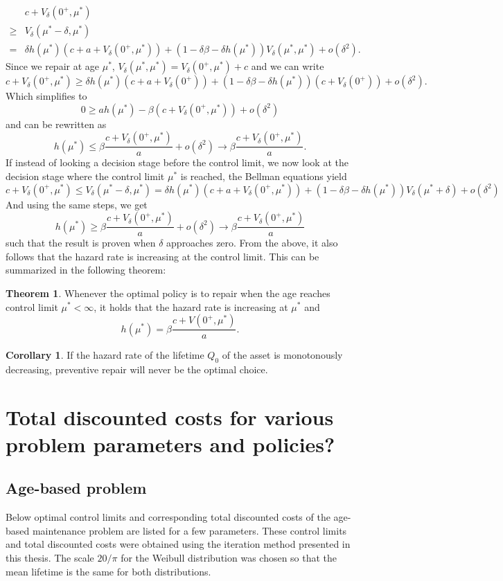 \documentclass[a4paper]{thesis}
\theoremstyle{definition}
\newtheorem{corollary}{Corollary}[chapter]
\newtheorem{theorem}{Theorem}[chapter]
\begin{document}
\begin{appendices}
\[\begin{split}
&c+V_\delta(0^+,\mu^*)\\
\geq& V_\delta(\mu^*-\delta,\mu^*)\\
=&\delta h(\mu^*)(c+a+ V_\delta(0^+,\mu^*))+(1-\delta\beta-\delta h(\mu^*)) V_\delta(\mu^*,\mu^*)+o(\delta^2).
\end{split}
\]
Since we repair at age $\mu^*$, $V_\delta(\mu^*,\mu^*)=V_\delta(0^+,\mu^*)+c$ and we can write
$$
c+V_\delta(0^+,\mu^*)\geq \delta h(\mu^*)(c+a+ V_\delta(0^+))+(1-\delta\beta-\delta h(\mu^*)) (c+V_\delta(0^+))+o(\delta^2).
$$
Which simplifies to
$$
0\geq ah(\mu^*)-\beta (c+V_\delta(0^+,\mu^*))+o(\delta^2)
$$
and can be rewritten as
$$
h(\mu^*)\leq \beta\frac{c+V_\delta(0^+,\mu^*)}{a} +o(\delta^2)\rightarrow\beta\frac{c+V_\delta(0^+,\mu^*)}{a}.
$$
If instead of looking a decision stage before the control limit, we now look at the decision stage where the control limit $\mu^*$ is reached, the Bellman equations yield
$$
c+V_\delta(0^+,\mu^*)\leq V_\delta(\mu^*-\delta,\mu^*)=\delta h(\mu^*)(c+a+ V_\delta(0^+,\mu^*))+(1-\delta\beta-\delta h(\mu^*)) V_\delta(\mu^*+\delta)+o(\delta^2)
$$
And using the same steps, we get
$$
h(\mu^*)\geq \beta\frac{c+V_\delta(0^+,\mu^*)}{a} +o(\delta^2)\rightarrow\beta\frac{c+V_\delta(0^+,\mu^*)}{a}
$$
such that the result is proven when $\delta$ approaches zero.
From the above, it also follows that the hazard rate is increasing at the control limit.
This can be summarized in the following theorem:

\begin{theorem}
	Whenever the optimal policy is to repair when the age reaches control limit $\mu^*<\infty$, it holds that the hazard rate is increasing at $\mu^*$ and
	\[h(\mu^*)=\beta\frac{c+V(0^+,\mu^*)}{a}.\]
\end{theorem}

\begin{corollary}
	If the hazard rate of the lifetime $Q_0$ of the asset is monotonously decreasing, preventive repair will never be the optimal choice.
\end{corollary} \chapter{Total discounted costs for various problem parameters and policies?}\label{AppendixComputationsTable}
\section{Age-based problem}
Below optimal control limits and corresponding total discounted costs of the age-based maintenance problem are listed for a few parameters.
These control limits and total discounted costs were obtained using the iteration method presented in this thesis.
The scale $20/\pi$ for the Weibull distribution was chosen so that the mean lifetime is the same for both distributions.


\end{appendices}
\end{document}
